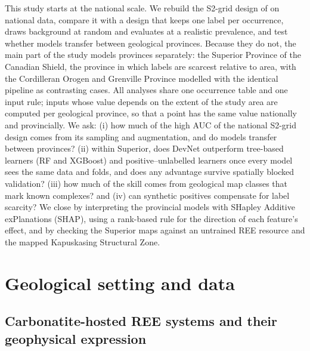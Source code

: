 \documentclass[pdflatex,sn-apa]{sn-jnl}
\begin{document}
This study starts at the national scale. We rebuild the S2-grid design of \citet{Parsa2024} on national data, compare it with a design that keeps one label per occurrence, draws background at random and evaluates at a realistic prevalence, and test whether models transfer between geological provinces. Because they do not, the main part of the study models provinces separately: the Superior Province of the Canadian Shield, the province in which labels are scarcest relative to area, with the Cordilleran Orogen and Grenville Province modelled with the identical pipeline as contrasting cases. All analyses share one occurrence table and one input rule; inputs whose value depends on the extent of the study area are computed per geological province, so that a point has the same value nationally and provincially. We ask: (i) how much of the high AUC of the national S2-grid design comes from its sampling and augmentation, and do models transfer between provinces? (ii) within Superior, does DevNet outperform tree-based learners (RF and XGBoost) and positive--unlabelled learners once every model sees the same data and folds, and does any advantage survive spatially blocked validation? (iii) how much of the skill comes from geological map classes that mark known complexes? and (iv) can synthetic positives compensate for label scarcity? We close by interpreting the provincial models with SHapley Additive exPlanations (SHAP), using a rank-based rule for the direction of each feature's effect, and by checking the Superior maps against an untrained REE resource and the mapped Kapuskasing Structural Zone.

\section{Geological setting and data}\label{sec:data}

\subsection{Carbonatite-hosted REE systems and their geophysical expression}\label{sec:mineral-system}
\end{document}
